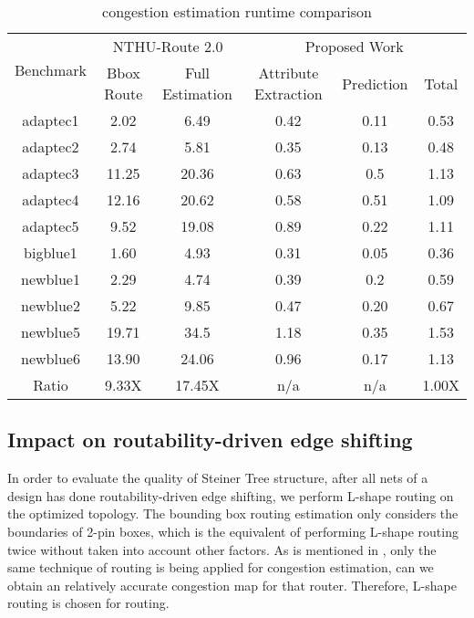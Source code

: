 \begin{table*}[htbp]
\caption{congestion estimation runtime comparison}
\begin{center}
\begin{tabular}{|c|c|c|c|c|c|}
\hline
\multirow{2}{*}{Benchmark} & \multicolumn{2}{c|}{NTHU-Route 2.0 \cite{NTHU}} & \multicolumn{3}{c|}{Proposed Work}        \\ \cline{2-6} 
                           & Bbox Route   & Full Estimation  & Attribute Extraction & Prediction & Total \\ \hline
adaptec1                   & 2.02         & 6.49             & 0.42                 & 0.11       & 0.53  \\ \hline
adaptec2                   & 2.74         & 5.81             & 0.35                 & 0.13       & 0.48  \\ \hline
adaptec3                   & 11.25        & 20.36            & 0.63                 & 0.5        & 1.13  \\ \hline
adaptec4                   & 12.16        & 20.62            & 0.58                 & 0.51       & 1.09  \\ \hline
adaptec5                   & 9.52         & 19.08            & 0.89                 & 0.22       & 1.11  \\ \hline
bigblue1                   & 1.60         & 4.93             & 0.31                 & 0.05       & 0.36  \\ \hline
newblue1                   & 2.29         & 4.74             & 0.39                 & 0.2        & 0.59  \\ \hline
newblue2                   & 5.22         & 9.85             & 0.47                 & 0.20       & 0.67  \\ \hline
newblue5                   & 19.71        & 34.5             & 1.18                 & 0.35       & 1.53  \\ \hline
newblue6                   & 13.90        & 24.06            & 0.96                 & 0.17       & 1.13  \\ \hline
Ratio                      & 9.33X        & 17.45X           & n/a                  & n/a        & 1.00X \\ \hline
\end{tabular}
\label{tab:runtime}
\end{center}
\end{table*}

\subsection{Impact on routability-driven edge shifting}
In order to evaluate the quality of Steiner Tree structure, after all nets of a design has done routability-driven edge shifting, we perform L-shape routing on the optimized topology. The bounding box routing estimation only considers the boundaries of 2-pin boxes, which is the equivalent of performing L-shape routing twice without taken into account other factors. As is mentioned in \cite{fastroute}, only the same technique of routing is being applied for congestion estimation, can we obtain an relatively accurate congestion map for that router. Therefore, L-shape routing is chosen for routing.

